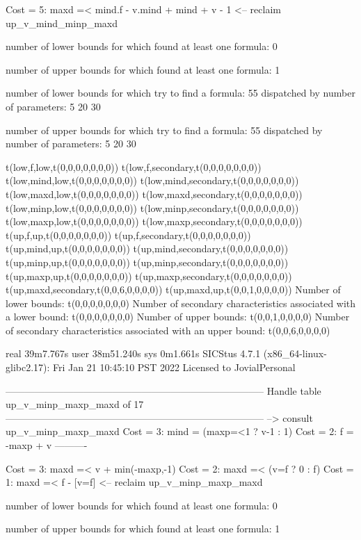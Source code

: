 Cost =  5:  maxd =< mind.f - v.mind + mind + v - 1
<-- reclaim up_v_mind_minp_maxd

number of lower bounds for which found at least one formula: 0

number of upper bounds for which found at least one formula: 1

number of lower bounds for which try to find a formula: 55
dispatched by number of parameters: 5  20  30

number of upper bounds for which try to find a formula: 55
dispatched by number of parameters: 5  20  30

t(low,f,low,t(0,0,0,0,0,0,0))
t(low,f,secondary,t(0,0,0,0,0,0,0))
t(low,mind,low,t(0,0,0,0,0,0,0))
t(low,mind,secondary,t(0,0,0,0,0,0,0))
t(low,maxd,low,t(0,0,0,0,0,0,0))
t(low,maxd,secondary,t(0,0,0,0,0,0,0))
t(low,minp,low,t(0,0,0,0,0,0,0))
t(low,minp,secondary,t(0,0,0,0,0,0,0))
t(low,maxp,low,t(0,0,0,0,0,0,0))
t(low,maxp,secondary,t(0,0,0,0,0,0,0))
t(up,f,up,t(0,0,0,0,0,0,0))
t(up,f,secondary,t(0,0,0,0,0,0,0))
t(up,mind,up,t(0,0,0,0,0,0,0))
t(up,mind,secondary,t(0,0,0,0,0,0,0))
t(up,minp,up,t(0,0,0,0,0,0,0))
t(up,minp,secondary,t(0,0,0,0,0,0,0))
t(up,maxp,up,t(0,0,0,0,0,0,0))
t(up,maxp,secondary,t(0,0,0,0,0,0,0))
t(up,maxd,secondary,t(0,0,6,0,0,0,0))
t(up,maxd,up,t(0,0,1,0,0,0,0))
Number of lower bounds:                                             t(0,0,0,0,0,0,0)
Number of secondary characteristics associated with a lower bound:  t(0,0,0,0,0,0,0)
Number of upper bounds:                                             t(0,0,1,0,0,0,0)
Number of secondary characteristics associated with an upper bound: t(0,0,6,0,0,0,0)

real	39m7.767s
user	38m51.240s
sys	0m1.661s
SICStus 4.7.1 (x86_64-linux-glibc2.17): Fri Jan 21 10:45:10 PST 2022
Licensed to JovialPersonal


--------------------------------------------------------------------------------
Handle table up_v_minp_maxp_maxd of 17
--------------------------------------------------------------------------------
--> consult up_v_minp_maxp_maxd
Cost =  3:  mind = (maxp=<1 ? v-1 : 1)
Cost =  2:  f    = -maxp + v
----------

Cost =  3:  maxd =< v + min(-maxp,-1) %
Cost =  2:  maxd =< (v=f ? 0 : f)
Cost =  1:  maxd =< f - [v=f] %
<-- reclaim up_v_minp_maxp_maxd

number of lower bounds for which found at least one formula: 0

number of upper bounds for which found at least one formula: 1

